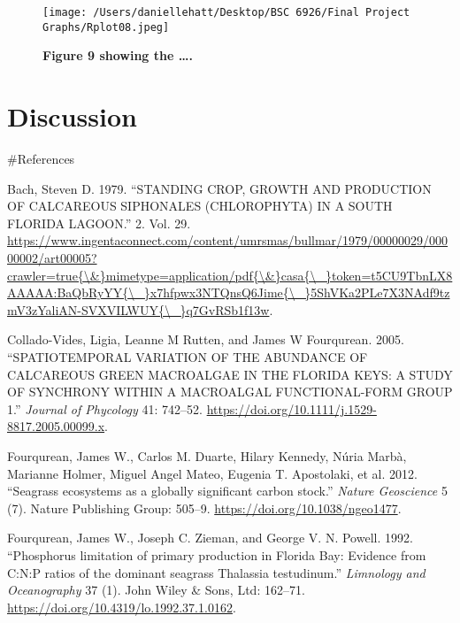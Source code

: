 \documentclass[]{article}
\begin{document}
\begin{figure}
\centering
\texttt{[image: /Users/daniellehatt/Desktop/BSC 6926/Final Project Graphs/Rplot08.jpeg]}
\caption{\textbf{Figure 9 showing the \ldots{}.}}
\end{figure}

\hypertarget{discussion}{%
\section{Discussion}\label{discussion}}

\#References

\setlength{\parindent}{-0.2in}
\setlength{\leftskip}{0.2in}
\setlength{\parskip}{8pt}

\noindent

\hypertarget{refs}{}
\leavevmode\hypertarget{ref-Bach1979}{}%
Bach, Steven D. 1979. ``STANDING CROP, GROWTH AND PRODUCTION OF
CALCAREOUS SIPHONALES (CHLOROPHYTA) IN A SOUTH FLORIDA LAGOON.'' 2. Vol.
29.
\href{https://www.ingentaconnect.com/content/umrsmas/bullmar/1979/00000029/00000002/art00005?crawler=true\%7B/\&\%7Dmimetype=application/pdf\%7B/\&\%7Dcasa\%7B/_\%7Dtoken=t5CU9TbnLX8AAAAA:BaQbRyYY\%7B/_\%7Dx7hfpwx3NTQnsQ6Jime\%7B/_\%7D5ShVKa2PLe7X3NAdf9tzmV3zYaliAN-SVXVILWUY\%7B/_\%7Dq7GvRSb1f13w}{https://www.ingentaconnect.com/content/umrsmas/bullmar/1979/00000029/00000002/art00005?crawler=true\{\textbackslash{}\&\}mimetype=application/pdf\{\textbackslash{}\&\}casa\{\textbackslash{}\_\}token=t5CU9TbnLX8AAAAA:BaQbRyYY\{\textbackslash{}\_\}x7hfpwx3NTQnsQ6Jime\{\textbackslash{}\_\}5ShVKa2PLe7X3NAdf9tzmV3zYaliAN-SVXVILWUY\{\textbackslash{}\_\}q7GvRSb1f13w}.

\leavevmode\hypertarget{ref-Collado-Vides2005}{}%
Collado-Vides, Ligia, Leanne M Rutten, and James W Fourqurean. 2005.
``SPATIOTEMPORAL VARIATION OF THE ABUNDANCE OF CALCAREOUS GREEN
MACROALGAE IN THE FLORIDA KEYS: A STUDY OF SYNCHRONY WITHIN A MACROALGAL
FUNCTIONAL-FORM GROUP 1.'' \emph{Journal of Phycology} 41: 742--52.
\url{https://doi.org/10.1111/j.1529-8817.2005.00099.x}.

\leavevmode\hypertarget{ref-Fourqurean2012}{}%
Fourqurean, James W., Carlos M. Duarte, Hilary Kennedy, Núria Marbà,
Marianne Holmer, Miguel Angel Mateo, Eugenia T. Apostolaki, et al. 2012.
``Seagrass ecosystems as a globally significant carbon stock.''
\emph{Nature Geoscience} 5 (7). Nature Publishing Group: 505--9.
\url{https://doi.org/10.1038/ngeo1477}.

\leavevmode\hypertarget{ref-Fourqurean1992}{}%
Fourqurean, James W., Joseph C. Zieman, and George V. N. Powell. 1992.
``Phosphorus limitation of primary production in Florida Bay: Evidence
from C:N:P ratios of the dominant seagrass Thalassia testudinum.''
\emph{Limnology and Oceanography} 37 (1). John Wiley \& Sons, Ltd:
162--71. \url{https://doi.org/10.4319/lo.1992.37.1.0162}.
\end{document}
